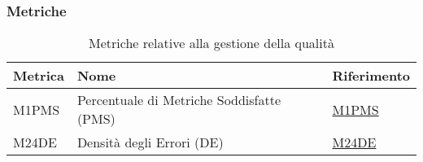 \subsubsection{Metriche}
\begin{table}[H]
    \centering
    \begin{tabular}{|C{3cm}|C{3cm}|C{4cm}|}
    \hline
    Metrica & Nome & Riferimento\\
    \hline \hline
    M1PMS & Percentuale di Metriche Soddisfatte (PMS) &  \hyperlink{item:M1PMS}{M1PMS} \\
    M24DE & Densità degli Errori (DE) &  \hyperlink{item:M24DE}{M24DE} \\
    \hline
    \end{tabular}
    \caption{Metriche relative alla gestione della qualità}
\end{table}

